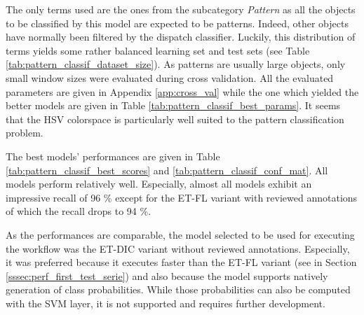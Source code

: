 The only terms used are the ones from the subcategory \textit{Pattern} as all the objects to be classified by this model are expected to be patterns.  Indeed, other objects have normally been filtered by the dispatch classifier. Luckily, this distribution of terms yields some rather balanced learning set and test sets (see Table \ref{tab:pattern_classif_dataset_size}). As patterns are usually large objects, only small window sizes were evaluated during cross validation. All the evaluated parameters are given in Appendix \ref{app:cross_val} while the one which yielded the better models are given in Table \ref{tab:pattern_classif_best_params}. It seems that the HSV colorspace is particularly well suited to the pattern classification problem. 

The best models' performances are given in Table \ref{tab:pattern_classif_best_scores} and \ref{tab:pattern_classif_conf_mat}. All models perform relatively well. Especially, almost all models exhibit an impressive recall of 96 \% except for the ET-FL variant with reviewed annotations of which the recall drops to 94 \%.

As the performances are comparable, the model selected to be used for executing the workflow was the ET-DIC variant without reviewed annotations. Especially, it was preferred because it executes faster than the ET-FL variant (see in Section \ref{sssec:perf_first_test_serie}) and also because the model supports natively generation of class probabilities. While those probabilities can also be computed with the SVM layer, it is not supported and requires further development. 

\begin{table}
	\small
	\center
	\caption{Pattern classifier. Dataset size.}
	\label{tab:pattern_classif_dataset_size}
\end{table}

